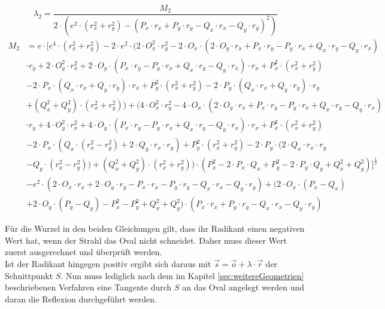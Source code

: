 \documentclass[reducespace,stylepage,semiarbeit]{spezidoc}
\begin{document}
\begin{equation*}
\lambda_2 = \dfrac{M_2}{2 \cdot (e^{2} \cdot (r_x^{2}+r_y^{2})-(P_x \cdot r_x+P_y \cdot r_y-Q_x \cdot r_x-Q_y \cdot r_y)^{2})}
\end{equation*}
\begin{equation*}
\begin{aligned}
M_2 &= e \cdot [e^{4} \cdot (r_x^{2} + r_y^{2}) - 2 \cdot e^{2} \cdot (2 \cdot O_x^{2} \cdot r_y^{2} - 2 \cdot O_x \cdot (2 \cdot O_y \cdot r_x + P_x \cdot r_y - P_y \cdot r_x + Q_x \cdot r_y - Q_y \cdot r_x) \\
& \cdot r_y + 2 \cdot O_y^{2} \cdot r_x^{2} + 2 \cdot O_y \cdot (P_x \cdot r_y - P_y \cdot r_x + Q_x \cdot r_y - Q_y \cdot r_x) \cdot r_x + P_x^{2} \cdot (r_x^{2} + r_y^{2}) \\
& - 2 \cdot P_x \cdot (Q_x \cdot r_x + Q_y \cdot r_y) \cdot r_x + P_y^{2} \cdot (r_x^{2} + r_y^{2}) - 2 \cdot P_y \cdot (Q_x \cdot r_x + Q_y \cdot r_y) \cdot r_y \\
&+ (Q_x^{2} + Q_y^{2}) \cdot (r_x^{2} + r_y^{2})) + (4 \cdot O_x^{2} \cdot r_y^{2} - 4 \cdot O_x \cdot (2 \cdot O_y \cdot r_x + P_x \cdot r_y - P_y \cdot r_x + Q_x \cdot r_y - Q_y \cdot r_x) \\
&\cdot r_y + 4 \cdot O_y^{2} \cdot r_x^{2} + 4 \cdot O_y \cdot (P_x \cdot r_y - P_y \cdot r_x + Q_x \cdot r_y - Q_y \cdot r_x) \cdot r_x + P_x^{2} \cdot (r_x^{2} + r_y^{2}) \\
&- 2 \cdot P_x \cdot (Q_x \cdot (r_x^{2} - r_y^{2}) + 2 \cdot Q_y \cdot r_x \cdot r_y) + P_y^{2} \cdot (r_x^{2} + r_y^{2}) - 2 \cdot P_y \cdot (2 \cdot Q_x \cdot r_x \cdot r_y \\
&- Q_y \cdot (r_x^{2} - r_y^{2})) + (Q_x^{2} + Q_y^{2}) \cdot (r_x^{2} + r_y^{2})) \cdot (P_x^{2} - 2 \cdot P_x \cdot Q_x + P_y^{2} - 2 \cdot P_y \cdot Q_y + Q_x^{2} + Q_y^{2})]^{\frac{1}{2}} \\
&- e^{2} \cdot (2 \cdot O_x \cdot r_x + 2 \cdot O_y \cdot r_y - P_x \cdot r_x - P_y \cdot r_y - Q_x \cdot r_x - Q_y \cdot r_y) + (2 \cdot O_x \cdot (P_x - Q_x) \\
&+ 2 \cdot O_y \cdot (P_y - Q_y) - P_x^{2} - P_y^{2} + Q_x^{2} + Q_y^{2}) \cdot (P_x \cdot r_x + P_y \cdot r_y - Q_x \cdot r_x - Q_y \cdot r_y)
\end{aligned}
\end{equation*}

Für die Wurzel in den beiden Gleichungen gilt, dass ihr Radikant einen negativen Wert hat, wenn der Strahl das Oval nicht schneidet. Daher muss dieser Wert zuerst ausgerechnet und überprüft werden.\\
Ist der Radikant hingegen positiv ergibt sich daraus mit $\vec{s} = \vec{o} + \lambda \cdot \vec{r}$ der Schnittpunkt $S$. Nun muss lediglich nach dem im Kapitel \ref{sec:weitereGeometrien} beschriebenen Verfahren eine Tangente durch $S$ an das Oval angelegt werden und daran die Reflexion durchgeführt werden.
\end{document}
